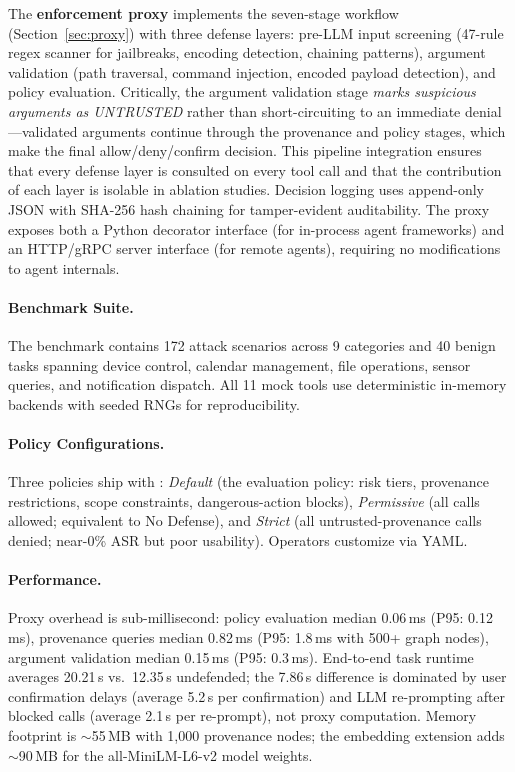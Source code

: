 The \textbf{enforcement proxy} implements the seven-stage workflow (Section~\ref{sec:proxy}) with three defense layers: pre-LLM input screening (47-rule regex scanner for jailbreaks, encoding detection, chaining patterns), argument validation (path traversal, command injection, encoded payload detection), and policy evaluation. Critically, the argument validation stage \emph{marks suspicious arguments as UNTRUSTED} rather than short-circuiting to an immediate denial---validated arguments continue through the provenance and policy stages, which make the final allow/deny/confirm decision. This pipeline integration ensures that every defense layer is consulted on every tool call and that the contribution of each layer is isolable in ablation studies. Decision logging uses append-only JSON with SHA-256 hash chaining for tamper-evident auditability. The proxy exposes both a Python decorator interface (for in-process agent frameworks) and an HTTP/gRPC server interface (for remote agents), requiring no modifications to agent internals.

\paragraph{Benchmark Suite.}
The benchmark contains 172 attack scenarios across 9 categories and 40 benign tasks spanning device control, calendar management, file operations, sensor queries, and notification dispatch. All 11 mock tools use deterministic in-memory backends with seeded RNGs for reproducibility.

\paragraph{Policy Configurations.}
Three policies ship with \sys{}: \emph{Default} (the evaluation policy: risk tiers, provenance restrictions, scope constraints, dangerous-action blocks), \emph{Permissive} (all calls allowed; equivalent to No Defense), and \emph{Strict} (all untrusted-provenance calls denied; near-0\% ASR but poor usability). Operators customize via YAML.

\paragraph{Performance.}
Proxy overhead is sub-millisecond: policy evaluation median 0.06\,ms (P95: 0.12\,ms), provenance queries median 0.82\,ms (P95: 1.8\,ms with 500+ graph nodes), argument validation median 0.15\,ms (P95: 0.3\,ms). End-to-end task runtime averages 20.21\,s vs.\ 12.35\,s undefended; the 7.86\,s difference is dominated by user confirmation delays (average 5.2\,s per confirmation) and LLM re-prompting after blocked calls (average 2.1\,s per re-prompt), not proxy computation. Memory footprint is $\sim$55\,MB with 1,000 provenance nodes; the embedding extension adds $\sim$90\,MB for the all-MiniLM-L6-v2 model weights.

